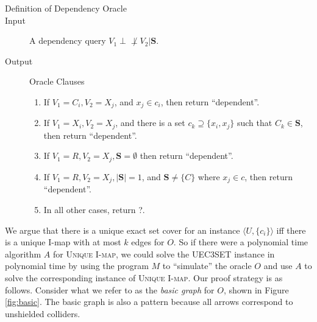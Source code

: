 \documentclass{elsarticle}%
\newcommand{\dep}{\ensuremath{{\perp{}\!\!\!\!\!\!\!\not  \perp{}}}}
\renewcommand{\S}{\mathbf{{S}}}
\begin{document}
\begin{description}
\item[Definition of Dependency Oracle]
\item[Input] A dependency query $V_1 \dep V_2 | \S$.

\item[Output] Oracle Clauses
\begin{enumerate}
\item If $V_{1}=C_{i},V_{2}=X_{j}$, and $x_{j}\in c_{i}$, then return
``dependent''. \label{set}
\item If $V_{1}=X_{i},V_{2}=X_{j}$,
and there is a set $c_{k}\supseteq\{x_{i},x_{j}\}$ such that $C_{k}\in \S$, then return ``dependent''. \label{member}
\item If $V_{1}= R,V_{2}=X_{j},\S = \emptyset$ then return ``dependent''. \label{emptyset}
\item If $V_{1}= R,V_{2}=X_{j}, |\S| = 1$, and $\S \neq \{C\}$ where $x_j \in c$, then return ``dependent''. \label{clause:single}
\item In all other cases, return ?.
\end{enumerate}
\end{description}
We argue that there is a unique exact set cover for an instance $\langle
U,\{c_{i}\}\rangle$ iff there is a unique I-map with at most $k$ edges for $O$. 
So if there were a polynomial time algorithm $A$ for \textsc{Unique I-map}, we could solve the \textsc{UEC3SET} instance in polynomial time by using the program $M$ to ``simulate'' the oracle $O$ and use $A$ to solve the corresponding instance of \textsc{Unique I-map}. 
Our proof strategy is as follows. Consider what we refer to as the {\em basic graph} for $O$, shown in Figure \ref{fig:basic}. 
The basic graph is
also a pattern because all arrows correspond to unshielded colliders. 
\end{document}
